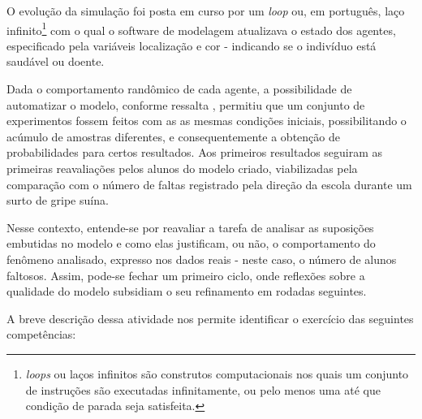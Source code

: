 O evolução da simulação foi posta em curso por um \textit{loop} ou, em português, laço infinito\footnote{\textit{loops} ou laços infinitos são construtos computacionais nos quais um conjunto de instruções são executadas infinitamente, ou pelo menos uma até que condição de parada seja satisfeita.} com o qual o software de modelagem atualizava o estado dos agentes, especificado pela variáveis localização e cor - indicando se o indivíduo está saudável ou doente. 

Dada o comportamento randômico de cada agente, a possibilidade de automatizar o modelo, conforme ressalta , permitiu que um conjunto de experimentos fossem feitos com as as mesmas condições iniciais, possibilitando o acúmulo de amostras diferentes, e consequentemente a obtenção de probabilidades para certos resultados. Aos primeiros resultados seguiram as primeiras reavaliações pelos alunos do modelo criado, viabilizadas pela comparação com o número de faltas registrado pela direção da escola durante um surto de gripe suína. 

Nesse contexto, entende-se por reavaliar a tarefa de analisar as suposições embutidas no modelo e como elas justificam, ou não, o comportamento do fenômeno analisado, expresso nos dados reais - neste caso, o número de alunos faltosos. Assim, pode-se fechar um primeiro ciclo, onde reflexões sobre a qualidade do modelo subsidiam o seu refinamento em rodadas seguintes.

A breve descrição dessa atividade nos permite identificar o exercício das seguintes competências:

